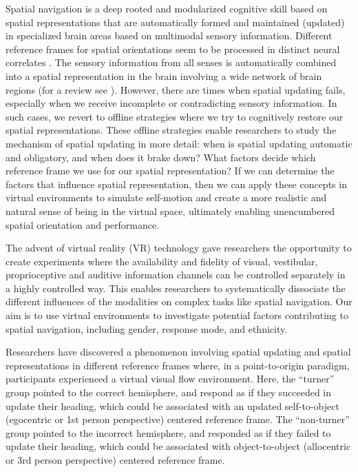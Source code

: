 \documentclass{frontiersSCNS} %
\begin{document}
Spatial navigation is a deep rooted and modularized cognitive skill based on spatial representations that are automatically formed and maintained (updated) in specialized brain areas based on multimodal sensory information. Different reference frames for spatial orientations seem to be processed in distinct neural correlates \citep{Gramann2010,Zaehle2007}. The sensory information from all senses is automatically combined into a spatial representation in the brain involving a wide network of brain regions (for a review see \cite{Moser2008}). However, there are times when spatial updating fails, especially when we receive incomplete or contradicting sensory information. In such cases, we revert to offline strategies where we try to cognitively restore our spatial representations. These offline strategies enable researchers to study the mechanism of spatial updating in more detail: when is spatial updating automatic and obligatory, and when does it brake down? What factors decide which reference frame we use for our spatial representation? If we can determine the factors that influence spatial representation, then we can apply these concepts in virtual environments to simulate self-motion and create a more realistic and natural sense of being in the virtual space, ultimately enabling unencumbered spatial orientation and performance. 

The advent of virtual reality (VR) technology gave researchers the opportunity to create experiments where the availability and fidelity of visual, vestibular, proprioceptive and auditive information channels can be controlled separately in a highly controlled way. This enables researchers to systematically dissociate the different influences of the modalities on complex tasks like spatial navigation. Our aim is to use virtual environments to investigate potential factors contributing to spatial navigation, including gender, response mode, and ethnicity.

Researchers have discovered a phenomenon involving spatial updating and spatial representations in different reference frames \citep{Klatzky1998} where, in a point-to-origin paradigm, participants experienced a virtual visual flow environment. Here, the “turner” group pointed to the correct hemisphere, and
respond as if they succeeded in update their heading, which could be associated with an updated self-to-object (egocentric or 1st person perspective) centered reference frame. The “non-turner” group pointed to the incorrect hemisphere, and responded as if they failed to update their heading, which could be associated with object-to-object (allocentric or 3rd person perspective) centered reference frame.
\end{document}
